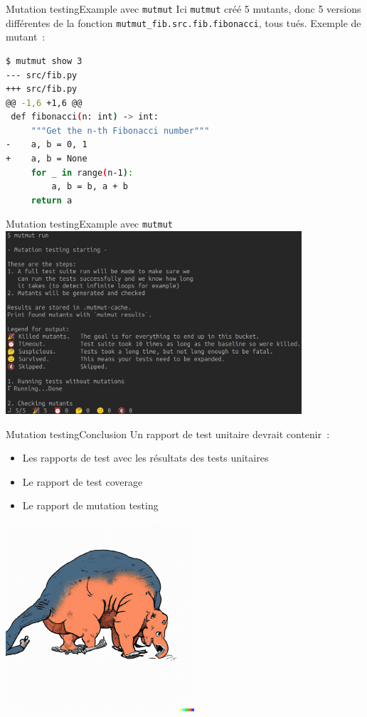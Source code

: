 \documentclass{beamer}
\begin{document}
    \begin{frame}[fragile]{Mutation testing}{Example avec \lstinline{mutmut}}
        \transdissolve
        Ici \lstinline{mutmut} créé 5 mutants, donc 5 versions différentes de la fonction \lstinline{mutmut_fib.src.fib.fibonacci}, tous tués.
        \bigbreak
        Exemple de mutant~:
        \begin{lstlisting}[language=bash]
$ mutmut show 3
--- src/fib.py
+++ src/fib.py
@@ -1,6 +1,6 @@
 def fibonacci(n: int) -> int:
     """Get the n-th Fibonacci number"""
-    a, b = 0, 1
+    a, b = None
     for _ in range(n-1):
         a, b = b, a + b
     return a
        \end{lstlisting}
    \end{frame}

    \begin{frame}{Mutation testing}{Example avec \lstinline{mutmut}}
        \transdissolve
        \centering
        \includegraphics[width=11cm]{image/mutmut-result}
    \end{frame}

    \begin{frame}{Mutation testing}{Conclusion}
        \transdissolve
        Un rapport de test unitaire devrait contenir~:
        \begin{itemize}
            \item Les rapports de test avec les résultats des tests unitaires
            \item Le rapport de test coverage
            \item Le rapport de mutation testing
        \end{itemize}
        \centering
        \includegraphics[width=7cm]{image/mutant}
    \end{frame}
\end{document}
